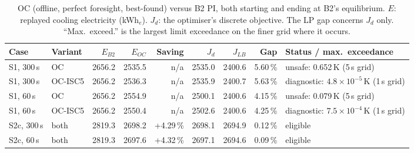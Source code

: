 \documentclass[12pt,a4paper]{report}
\theoremstyle{definition}
\newcommand{\kWhe}{kWh$_e$}
\begin{document}
\begin{table}[H]
\centering\footnotesize
\caption{OC (offline, perfect foresight, best-found) versus B2 PI, both starting and ending at B2's equilibrium. $E$: replayed cooling electricity (\kWhe). $J_d$: the optimiser's discrete objective. The LP gap concerns $J_d$ only. ``Max.\ exceed.'' is the largest limit exceedance on the finer grid where it occurs.}
\label{tab:oc}
\setlength{\tabcolsep}{3pt}
\begin{tabularx}{\textwidth}{@{}llrrrrrrX@{}}
\toprule
Case & Variant & $E_{B2}$ & $E_{OC}$ & Saving & $J_{d}$ & $J_{LB}$ & Gap & Status / max.\ exceedance\\
\midrule
S1, 300\,s & OC      & 2656.2 & 2535.5 & n/a & 2535.0 & 2400.6 & 5.60\,\% & unsafe: 0.652\,K (5\,s grid)\\
S1, 300\,s & OC-ISC5 & 2656.2 & 2536.3 & n/a & 2535.9 & 2400.7 & 5.63\,\% & diagnostic: $4.8\times10^{-5}$\,K (1\,s grid)\\
S1, 60\,s  & OC      & 2656.2 & 2554.9 & n/a & 2500.1 & 2400.6 & 4.15\,\% & unsafe: 0.079\,K (5\,s grid)\\
S1, 60\,s  & OC-ISC5 & 2656.2 & 2550.4 & n/a & 2502.6 & 2400.6 & 4.25\,\% & diagnostic: $7.5\times10^{-4}$\,K (1\,s grid)\\
S2c, 300\,s & both   & 2819.3 & 2698.2 & +4.29\,\% & 2698.1 & 2694.9 & 0.12\,\% & eligible\\
S2c, 60\,s  & both   & 2819.3 & 2697.6 & +4.32\,\% & 2697.1 & 2694.6 & 0.09\,\% & eligible\\
\bottomrule
\end{tabularx}
\end{table}
\end{document}
